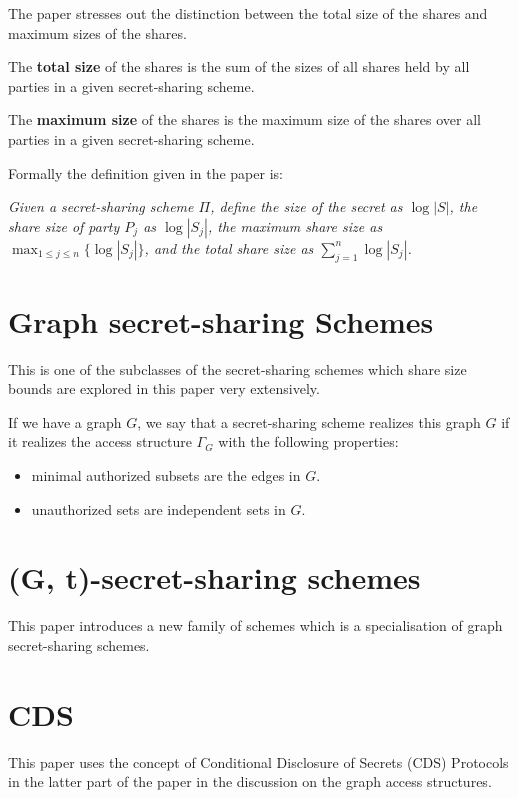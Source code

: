 The paper stresses out the distinction between the total size of the shares and maximum sizes of the shares.

The \textbf{total size} of the shares is the sum of the sizes of all shares held by all parties in a given secret-sharing scheme.

The \textbf{maximum size} of the shares is the maximum size of the shares over all parties in a given secret-sharing scheme.

Formally the definition given in the paper is:

\emph{Given a secret-sharing scheme $\Pi$,
define the \emph{size} of the secret as $\log |S|$,
the \emph{share size} of party $P_j$ as $\log |S_j|$,
the \emph{maximum share size} as $\max_{1\le j \le n} \{\log |S_j| \}$,
and the \emph{total share size} as $\sum_{j=1}^{n} \log |S_j|$.
}

\section{Graph secret-sharing Schemes}

This is one of the subclasses of the secret-sharing schemes which share size bounds are explored in this paper very extensively.

If we have a graph $G$, we say that a secret-sharing scheme realizes this graph $G$ if it realizes the access structure $\Gamma_G$ with the following properties:

\begin{itemize}
    \item minimal authorized subsets are the edges in $G$.
    \item unauthorized sets are independent sets in $G$.
\end{itemize}

\section{(G, t)-secret-sharing schemes}

This paper introduces a new family of schemes which is a specialisation of graph secret-sharing schemes.


\section{CDS}

This paper uses the concept of Conditional Disclosure of Secrets (CDS) Protocols in the latter part of the paper in the discussion on the graph access structures.

